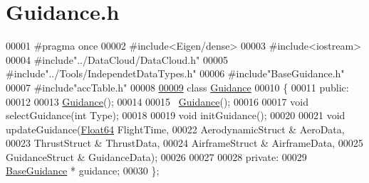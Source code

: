 \hypertarget{_guidance_8h_source}{}\section{Guidance.\+h}
\label{_guidance_8h_source}

\begin{DoxyCode}
00001 \textcolor{preprocessor}{#pragma once}
00002 \textcolor{preprocessor}{#include<Eigen/dense>}
00003 \textcolor{preprocessor}{#include<iostream>}
00004 \textcolor{preprocessor}{#include"../DataCloud/DataCloud.h"}
00005 \textcolor{preprocessor}{#include"../Tools/IndependetDataTypes.h"}
00006 \textcolor{preprocessor}{#include"BaseGuidance.h"}
00007 \textcolor{preprocessor}{#include"accTable.h"}
00008 
\hyperlink{class_guidance}{00009} \textcolor{keyword}{class }\hyperlink{class_guidance}{Guidance}
00010 \{
00011 \textcolor{keyword}{public}:
00012 
00013     \hyperlink{class_guidance}{Guidance}();
00014 
00015     ~\hyperlink{class_guidance}{Guidance}();
00016 
00017     \textcolor{keywordtype}{void} selectGuidance(\textcolor{keywordtype}{int} Type);
00018 
00019     \textcolor{keywordtype}{void} initGuidance();
00020 
00021     \textcolor{keywordtype}{void} updateGuidance(\hyperlink{group___tools_ga3f1431cb9f76da10f59246d1d743dc2c}{Float64} FlightTime, 
00022                         AerodynamicStruct & AeroData, 
00023                         ThrustStruct & ThrustData,
00024                         AirframeStruct & AirframeData, 
00025                         GuidanceStruct & GuidanceData);
00026 
00027 
00028 \textcolor{keyword}{private}:
00029     \hyperlink{class_base_guidance}{BaseGuidance} * guidance;
00030 \};
\end{DoxyCode}
